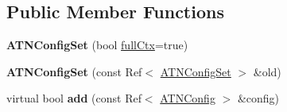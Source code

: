 \subsection*{Public Member Functions}
\begin{DoxyCompactItemize}
\item 
\mbox{\label{classantlr4_1_1atn_1_1ATNConfigSet_a69c297789ef198d08b6690587b74b44a}} 
{\bfseries A\+T\+N\+Config\+Set} (bool \hyperlink{classantlr4_1_1atn_1_1ATNConfigSet_af5ef274bd4b6185f2865add7f943633c}{full\+Ctx}=true)
\item 
\mbox{\label{classantlr4_1_1atn_1_1ATNConfigSet_a22c2e827ee70c41d4a6ef326e211ea4d}} 
{\bfseries A\+T\+N\+Config\+Set} (const Ref$<$ \hyperlink{classantlr4_1_1atn_1_1ATNConfigSet}{A\+T\+N\+Config\+Set} $>$ \&old)
\item 
\mbox{\label{classantlr4_1_1atn_1_1ATNConfigSet_aa2fc9693c9586947a34877d179020f73}} 
virtual bool {\bfseries add} (const Ref$<$ \hyperlink{classantlr4_1_1atn_1_1ATNConfig}{A\+T\+N\+Config} $>$ \&config)
\end{DoxyCompactItemize}

